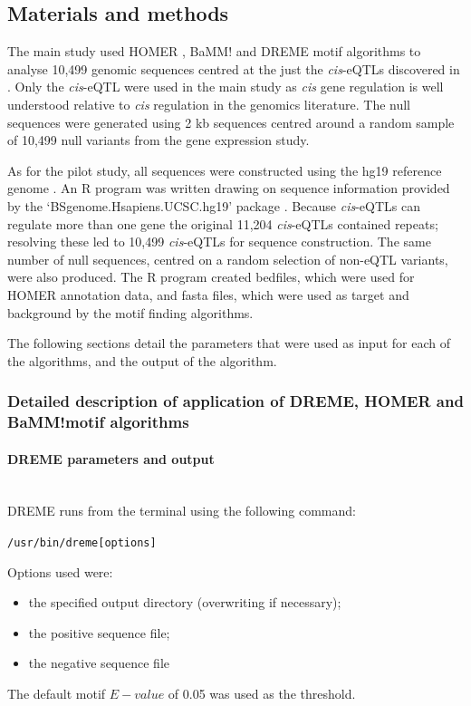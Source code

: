\documentclass[12pt]{article}
\begin{document}
\subsection{Materials and methods}

The main study used HOMER  \citep{heinz2010simple}, BaMM! \citep{siebert2016bayesian} and DREME \citep{bailey2011dreme} motif algorithms to analyse 10,499 genomic sequences centred at the just the \emph{cis}-eQTLs discovered in \citet{lloyd2017genetic}. Only the \emph{cis}-eQTL were used in the main study as  \emph{cis} gene regulation is well understood relative to  \emph{cis} regulation in the genomics literature. The null sequences were generated using 2 kb sequences centred around a random sample of 10,499 null variants from the \citet{lloyd2017genetic} gene expression study. 

As for the pilot study, all sequences were constructed using the hg19 reference genome \citep{Lander2001}. An R program was written drawing on sequence information provided by the `BSgenome.Hsapiens.UCSC.hg19' package \citep{TeamTBD2014}. Because \emph{cis}-eQTLs can regulate more than one gene the original 11,204 \emph{cis}-eQTLs contained repeats; resolving these led to 10,499 \emph{cis}-eQTLs for sequence construction. The same number of null sequences, centred on a random selection of non-eQTL variants, were also produced. The R program created bedfiles, which were used for HOMER annotation data, and fasta files, which were used as target and background by the motif finding algorithms.

The following sections detail the parameters that were used as input for each of the algorithms, and the output of the algorithm.

\subsubsection{Detailed description of application of DREME, HOMER and  BaMM!motif algorithms}



\paragraph{DREME parameters and output}\mbox{}\\
DREME runs from the terminal using the following command:

\texttt{/usr/bin/dreme[options]}

Options used were:
\begin{itemize}
\item the specified output directory (overwriting if necessary);
\item the positive sequence file; 
\item the negative sequence file
\end{itemize}
The default motif $E-value$ of 0.05 was used as the threshold.
\end{document}
